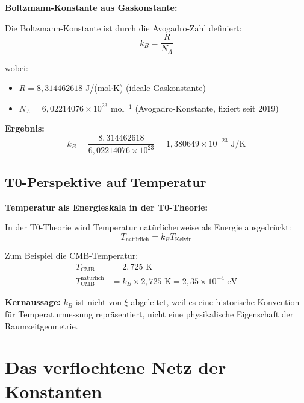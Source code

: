 \documentclass[12pt,a4paper]{article}
\begin{document}
	\begin{keyresult}
		\textbf{Boltzmann-Konstante aus Gaskonstante:}
		
		Die Boltzmann-Konstante ist durch die Avogadro-Zahl definiert:
		\begin{equation}
			k_B = \frac{R}{N_A}
		\end{equation}
		
		wobei:
		\begin{itemize}
			\item $R = 8{,}314462618$ J/(mol$\cdot$K) (ideale Gaskonstante)
			\item $N_A = 6{,}02214076 \times 10^{23}$ mol$^{-1}$ (Avogadro-Konstante, fixiert seit 2019)
		\end{itemize}
		
		\textbf{Ergebnis:}
		\begin{equation}
			k_B = \frac{8{,}314462618}{6{,}02214076 \times 10^{23}} = 1{,}380649 \times 10^{-23} \text{ J/K}
		\end{equation}
	\end{keyresult}
	
	\subsection{T0-Perspektive auf Temperatur}
	
	\begin{insight}
		\textbf{Temperatur als Energieskala in der T0-Theorie:}
		
		In der T0-Theorie wird Temperatur nat{\"u}rlicherweise als Energie ausgedr{\"u}ckt:
		\begin{equation}
			T_{\text{nat{\"u}rlich}} = k_B T_{\text{Kelvin}}
		\end{equation}
		
		Zum Beispiel die CMB-Temperatur:
		\begin{align}
			T_{\text{CMB}} &= 2{,}725 \text{ K} \\
			T_{\text{CMB}}^{\text{nat{\"u}rlich}} &= k_B \times 2{,}725 \text{ K} = 2{,}35 \times 10^{-4} \text{ eV}
		\end{align}
		
		\textbf{Kernaussage:} $k_B$ ist nicht von $\xi$ abgeleitet, weil es eine historische Konvention f{\"u}r Temperaturmessung repr{\"a}sentiert, nicht eine physikalische Eigenschaft der Raumzeitgeometrie.
	\end{insight}
	
	\section{Das verflochtene Netz der Konstanten}
	
\end{document}
